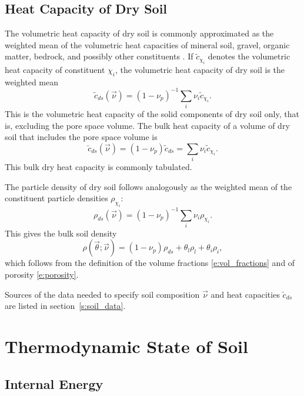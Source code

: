 \documentclass{report}
\begin{document}
\subsection{Heat Capacity of Dry Soil}

The volumetric heat capacity of dry soil is commonly approximated as the weighted mean of the volumetric heat capacities of mineral soil, gravel, organic matter, bedrock, and possibly other constituents \citep{Farouki81a}. If ${\tilde c}_{\chi_i}$ denotes the volumetric heat capacity of constituent $\chi_i$, the volumetric heat capacity of dry soil is the weighted mean 
\begin{equation}\label{e:dry_soil_heat_capacity}
\tilde{c}_{ds} (\vec{\nu}) = (1-\nu_p)^{-1} \sum_i \nu_{i} {\tilde c}_{\chi_i}.
\end{equation}
This is the volumetric heat capacity of the solid components of dry soil only, that is, excluding the pore space volume. The bulk heat capacity of a volume of dry soil that includes the pore space volume is
\begin{equation}\label{e:bulk_dry_heat_capacity}
    \check{c}_{ds} (\vec{\nu})  = (1-\nu_p) \tilde{c}_{ds} = \sum_i \nu_{i} {\tilde c}_{\chi_i}.
\end{equation}
This bulk dry heat capacity is commonly tabulated. 

The particle density of dry soil follows analogously as the weighted mean of the constituent particle densities $\rho_{\chi_i}$:
\begin{equation}\label{d:dry_soil_density}
    \rho_{ds}(\vec{\nu})  = (1-\nu_p)^{-1} \sum_i \nu_{i} {\rho}_{\chi_i}.
\end{equation}
This gives the bulk soil density  
\begin{equation}\label{e:bulk_density}
\rho (\vec{\theta}; \vec{\nu}) = (1-\nu_p) \rho_{ds} + \theta_l \rho_l + \theta_i \rho_i,
\end{equation}
which follows from the definition of the volume fractions \eqref{e:vol_fractions} and of porosity \eqref{e:porosity}. 

Sources of the data needed to specify soil composition $\vec{\nu}$ and heat capacities $\check c_{ds}$ are listed in section~\ref{s:soil_data}.

\section{Thermodynamic State of Soil}

\subsection{Internal Energy}
\end{document}
